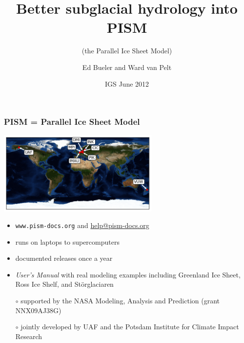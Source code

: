 \documentclass[hide notes,intlimits]{beamer}
\title[]{Better subglacial hydrology into PISM}
\subtitle{(the Parallel Ice Sheet Model)}
\author[Bueler \and van Pelt]{Ed Bueler\inst{*} and Ward van Pelt\inst{\dagger}}
\institute{\inst{*} University of Alaska Fairbanks \and %
           \inst{\dagger} IMAU, Utrecht, Netherlands}
\date{IGS June 2012}
\begin{document}


{
} 

\begin{frame}
  \titlepage
\end{frame}

{
}



\newcommand{\scream}[1]{\alert{\textbf{#1}}}

\begin{frame}
  \frametitle{PISM = Parallel Ice Sheet Model}

  \begin{center}
      \includegraphics[width=80mm]{figs/pism-users-map}
  \end{center}

\vspace{-2mm}
  \begin{itemize}
  \item \alert{\large\texttt{www.pism-docs.org}}  and  \url{help@pism-docs.org}
  \item runs on laptops to supercomputers
  \item documented releases once a year
  \item \emph{User's Manual} with real modeling examples including Greenland Ice Sheet, Ross Ice Shelf, and St\"orglaciaren
  
  \bigskip
  \scriptsize
  \item[$\circ$] supported by the NASA Modeling, Analysis and Prediction (grant NNX09AJ38G)
  \item[$\circ$] jointly developed by UAF and the Potsdam Institute for Climate Impact Research
  \end{itemize}
\end{frame}
\end{document}
